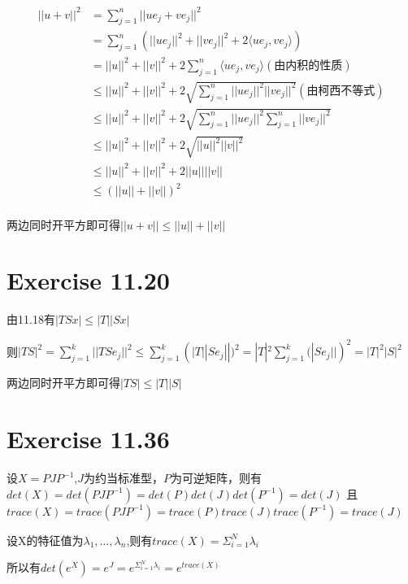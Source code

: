 \documentclass[twoside,a4paper]{article}
\begin{document}
\begin{align}
  ||u+v||^2&= \sum_{j=1}^n||ue_j+ve_j||^2\\
  &= \sum_{j=1}^n(||ue_j||^2+||ve_j||^2+2\langle ue_j,ve_j\rangle)\\
  &=||u||^2+||v||^2+2\sum_{j=1}^n\langle ue_j,ve_j\rangle(\mbox{由内积的性质})\\
  &\le ||u||^2+||v||^2+2\sqrt{\sum_{j=1}^n||ue_j||^2||ve_j||^2}(\mbox{由柯西不等式})\\
  &\le ||u||^2+||v||^2+2\sqrt{\sum_{j=1}^n||ue_j||^2\sum_{j=1}^n||ve_j||^2}\\
  &\le ||u||^2+||v||^2+2\sqrt{||u||^2||v||^2}\\
  &\le ||u||^2+||v||^2+2||u||||v||\\
  &\le (||u||+||v||)^2\\
\end{align}

两边同时开平方即可得$||u+v||\le ||u||+||v||$


\section{Exercise 11.20}

由11.18有$|TSx|\le|T||Sx|$

则$|TS|^2=\sum_{j=1}^k||TSe_j||^2\le\sum_{j=1}^k(|T||Se_j||)^2=|T|^2\sum_{j=1}^k(|Se_j||)^2=|T|^2|S|^2$

两边同时开平方即可得$|TS|\le|T||S|$

\section{Exercise 11.36}

设$X=PJP^{-1}$,$J$为约当标准型，$P$为可逆矩阵，则有$det(X)=det(PJP^{-1})=det(P)det(J)det(P^{-1})=det(J)$
且$trace(X)=trace(PJP^{-1})=trace(P)trace(J)trace(P^{-1})=trace(J)$

设X的特征值为$\lambda_1,\dots,\lambda_n$,则有$trace(X)=\Sigma_{i=1}^N\lambda_i$

所以有$det(e^{X})=e^{J}=e^{\Sigma_{i=1}^N\lambda_i}=e^{trace(X)}$
\end{document}
